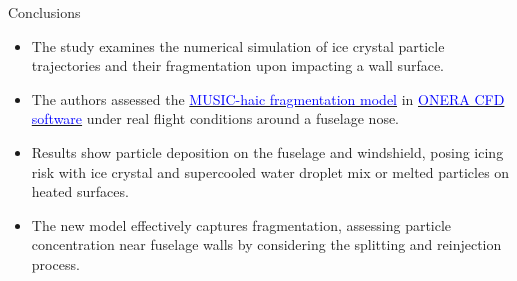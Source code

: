 \documentclass[aspectratio=169,xcolor=dvipsnames]{beamer}
\begin{document}
\begin{frame}{Conclusions}
   \begin{itemize}
       \item The study examines the numerical simulation of ice crystal particle trajectories and their fragmentation upon impacting a wall surface.
       \item The authors assessed the \href{https://www.music-haic.eu/page/en/media-center/available-documentation.php}{\textcolor{blue}{MUSIC-haic fragmentation model}} in \href{https://www.onera.fr/en/site-index/computational-fluid-dynamics.html}{\textcolor{blue}{ONERA CFD software}} under real flight conditions around a fuselage nose.
       \item Results show particle deposition on the fuselage and windshield, posing icing risk with ice crystal and supercooled water droplet mix or melted particles on heated surfaces.
       \item The new model effectively captures fragmentation, assessing particle concentration near fuselage walls by considering the splitting and reinjection process.
   \end{itemize}
\end{frame}
\end{document}
